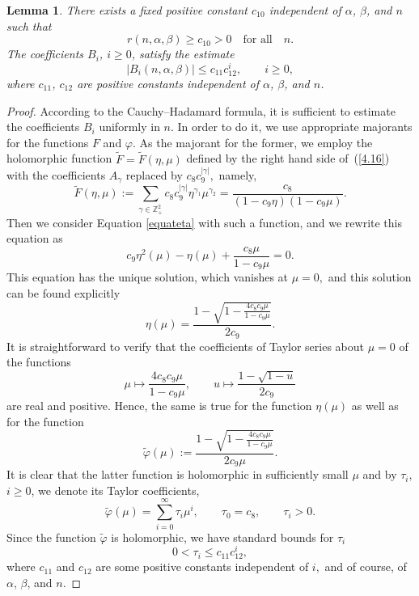 \documentclass[10pt, a4paper]{article}
\theoremstyle{plain}
\newtheorem{lemma}{Lemma}
\theoremstyle{definition}
\numberwithin{equation}{section}
\def\g{\gamma}
\def\a{\alpha}
\def\b{\beta}
\begin{document}
\begin{lemma}\label{lm4.3}
There exists a fixed positive constant $c_{10}$   independent of $\alpha$, $\beta$, and $n$ such that
$$
r(n,\a,\b)\geqslant c_{10}>0\quad \text{for all}\quad n.
$$
The coefficients $B_i$, $i\geqslant 0$, satisfy the estimate
\begin{equation}\label{4.24**}
|B_i(n,\a,\b)|\leqslant c_{11} c_{12}^i,\qquad i\geqslant 0,
\end{equation}
where $c_{11}$, $c_{12}$ are positive constants independent of $\alpha$, $\beta$, and $n$.
\end{lemma}
\begin{proof}
According to the Cauchy--Hadamard formula, it is sufficient to
estimate the coefficients $B_i$ uniformly in $n$. In order to do it, we use appropriate majorants for the functions
$F$ and $\varphi$. As the majorant for the former, we employ the holomorphic function
$\widetilde{F}=\widetilde{F}(\eta,\mu)$ defined
by the right hand side of~(\ref{4.16}) with the coefficients $A_\g$ replaced by $c_{8} c_{9}^{|\g|},$ namely,
\begin{equation*}
\widetilde{F}(\eta,\mu):=\sum\limits_{\gamma\in\mathds{Z}_+^2}
c_{8} c_{9}^{|\g|} \eta^{\gamma_1}\mu^{\gamma_2}=\frac{c_{8}}{(1-c_{9}\eta)(1-c_{9}\mu)}.
\end{equation*}
Then we consider   Equation \eqref{equateta} with such a function, and we rewrite this equation as
$$
c_{9}\eta^2(\mu)-\eta(\mu)+\frac{c_{8}\mu}{1-c_{9}\mu}=0.
$$
This equation has the unique solution, which vanishes at $\mu=0,$  and this solution can be found explicitly
$$
\eta(\mu)=\frac{1-\sqrt{1-\frac{4c_{8}c_{9}\mu}{1-c_{9}\mu} }}{2c_{9}}.
$$
It is straightforward to verify that the coefficients of    Taylor series about $\mu=0$ of the functions
\begin{equation*}
\mu\mapsto \frac{4c_{8}c_{9}\mu}{1-c_{9}\mu},\qquad u\mapsto \frac{1-\sqrt{1-u}}{2c_{9}}
\end{equation*}
are real and positive. Hence, the same is true for the function $\eta(\mu)$ as well as for
the function
$$
\widetilde{\varphi}(\mu):=\frac{1-\sqrt{1-\frac{4c_{8}c_{9}\mu}{1-c_{9}\mu}}}{2c_{9}\mu}.
$$
It is clear that the latter function is holomorphic in sufficiently small $\mu$ and by $\tau_i,$ $i\geqslant 0$, we denote its
Taylor coefficients,
\begin{equation*}
\widetilde{\varphi}(\mu)=\sum\limits_{i=0}^{\infty} \tau_i\mu^i,\qquad \tau_0=c_{8},\qquad \tau_i>0.
\end{equation*}
Since the function $\widetilde{\varphi}$ is holomorphic, we have standard bounds for $\tau_i$
\begin{equation*}%
0<\tau_i\leqslant c_{11} c_{12}^i,
\end{equation*}
where $c_{11}$ and $c_{12}$ are some positive constants independent of $i,$ and of course, of $\alpha$, $\beta$, and $n$.


\end{proof}
\end{document}
